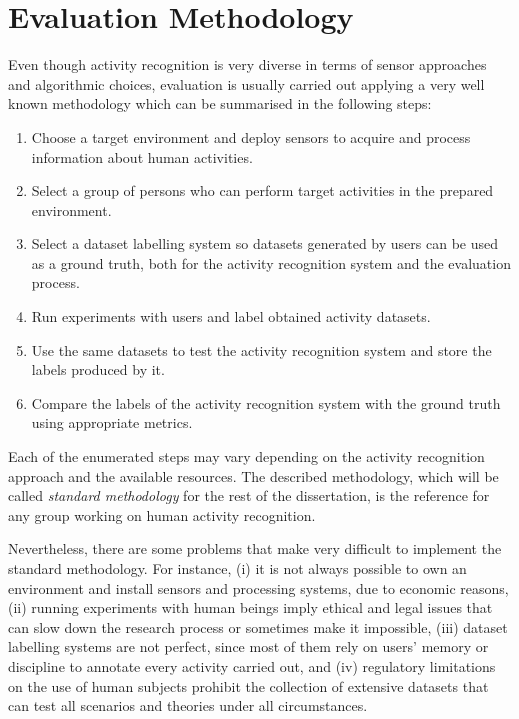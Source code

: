 \section{Evaluation Methodology}
\label{sec:evaluation:methodology}

Even though activity recognition is very diverse in terms of sensor approaches and algorithmic choices, evaluation is usually carried out applying a very well known methodology which can be summarised in the following steps:

\begin{enumerate}
 \item Choose a target environment and deploy sensors to acquire and process information about human activities. 
 \item Select a group of persons who can perform target activities in the prepared environment.
 \item Select a dataset labelling system so datasets generated by users can be used as a ground truth, both for the activity recognition system and the evaluation process.
 \item Run experiments with users and label obtained activity datasets.
 \item Use the same datasets to test the activity recognition system and store the labels produced by it.
 \item Compare the labels of the activity recognition system with the ground truth using appropriate metrics.
\end{enumerate}


Each of the enumerated steps may vary depending on the activity recognition approach and the available resources. The described methodology, which will be called \textit{standard methodology} for the rest of the dissertation, is the reference for any group working on human activity recognition.

Nevertheless, there are some problems that make very difficult to implement the standard methodology. For instance, (i) it is not always possible to own an environment and install sensors and processing systems, due to economic reasons, (ii) running experiments with human beings imply ethical and legal issues that can slow down the research process or sometimes make it impossible, (iii) dataset labelling systems are not perfect, since most of them rely on users' memory or discipline to annotate every activity carried out, and (iv) regulatory limitations on the use of human subjects prohibit the collection of extensive datasets that can test all scenarios and theories under all circumstances. 

